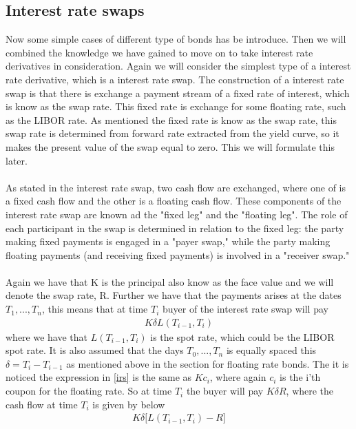 \subsection{Interest rate swaps}
Now some simple cases of different type of bonds has be introduce. Then we will combined the knowledge we have gained to move on
to take interest rate derivatives in consideration. Again we will consider the simplest type of a interest rate derivative, which is a
interest rate swap. The construction of a interest rate swap is that there is exchange a payment stream of a fixed rate of interest,
which is know as the swap rate. This fixed rate is exchange for some floating rate, such as the LIBOR rate. 
As mentioned the fixed rate is know as the swap rate, this swap rate is determined from forward rate extracted from the yield curve, 
so it makes the present value of the swap equal to zero. This we will formulate this later. 
\\\\
As stated in the interest rate swap, two cash flow are exchanged, where one of is a 
fixed cash flow and the other is a floating cash flow. These components of
the interest rate swap are known ad the "fixed leg" and the "floating leg". 
The role of each participant in the swap is determined in relation to the 
fixed leg: the party making fixed payments is engaged in a "payer swap," 
while the party making floating payments (and receiving fixed payments) is
 involved in a "receiver swap."
\\\\
Again we have that K is the principal also know as the face value and we will denote the swap rate, R. Further we have that the payments
arises at the dates $T_1,...,T_n$, this means that at time $T_i$ buyer of the interest rate swap will pay
\begin{align}
    K \delta L(T_{i-1},T_i)
    \label{irs}
\end{align}
where we have that $L(T_{i-1},T_i)$ is the spot rate, which could be the LIBOR spot rate.
  It is also assumed
that the days $T_0,...,T_n$ is equally spaced this $\delta = T_i - T_{i-1}$ as mentioned above in the section for floating rate bonds. 
The it is noticed the expression in \autoref{irs} is the same as $Kc_i$, where again $c_i$ is the i'th coupon for the floating rate. 
So at time $T_i$ the buyer will pay $K \delta R$, where the cash flow at time $T_i$ is given by below
\begin{align*}
    K \delta \Big[L(T_{i-1},T_i)-R \Big]
\end{align*}

